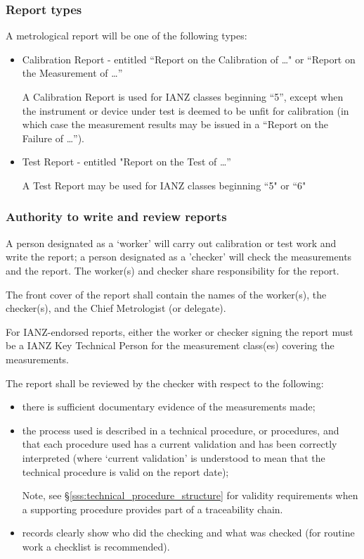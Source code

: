 \subsubsection{Report types}
A metrological report will be one of the following types:
\begin{itemize}
\item Calibration Report - entitled ``Report on the Calibration of \ldots" or ``Report on the Measurement of \ldots'' 

A Calibration Report is used for IANZ classes beginning ``5'', except when the instrument or device under test is deemed to be unfit for calibration (in which case the measurement results may be issued in a ``Report on the Failure of \ldots'').

\item Test Report - entitled "Report on the Test of \ldots''  

A Test Report may be used for IANZ classes beginning ``5" or ``6"
\end{itemize} 

\subsubsection{Authority to write and review reports}
A person designated as a `worker' will carry out calibration or test work and write the report; a person designated as a 'checker' will check the measurements and the report. The worker(s) and checker share responsibility for the report.

The front cover of the report shall contain the names of the worker(s), the checker(s), and the Chief Metrologist (or delegate).

For IANZ-endorsed reports, either the worker or checker signing the report must be a IANZ Key Technical Person for the measurement class(es) covering the measurements.

The report shall be reviewed by the checker with respect to the following: 
\begin{itemize}
\item there is sufficient documentary evidence of the measurements made;
\item the process used is described in a technical procedure, or procedures, and that each procedure used has a current validation and has been correctly interpreted (where `current validation' is understood to mean that the technical procedure is valid on the report date);

Note, see \S\ref{sss:technical_procedure_structure} for validity requirements when a supporting procedure provides part of a traceability chain.

\item records clearly show who did the checking and what was checked (for routine work a checklist is recommended).
\end{itemize} 

